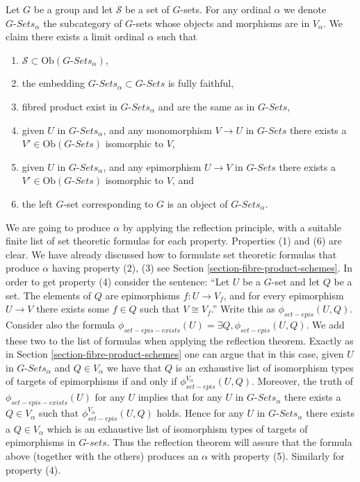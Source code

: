 \noindent
Let $G$ be a group and let $\mathcal{S}$ be a 
set of $G$-sets. For any ordinal $\alpha$ we denote
$G\textit{-Sets}_\alpha$ the subcategory of $G$-sets
whose objects and morphisms are in $V_\alpha$.
We claim there exists a limit ordinal $\alpha$ such that
\begin{enumerate}
\item $\mathcal{S} \subset \text{Ob}(G\textit{-Sets}_\alpha)$,
\item the embedding $G\textit{-Sets}_\alpha \subset G\textit{-Sets}$
is fully faithful,
\item fibred product exist in $G\textit{-Sets}_\alpha$
and are the same as in $G\textit{-Sets}$,
\item given $U$ in $G\textit{-Sets}_\alpha$, and any monomorphism
$V \to U$ in $G\textit{-Sets}$ there exists a
$V' \in \text{Ob}(G\textit{-Sets})$ isomorphic to $V$,
\item given $U$ in $G\textit{-Sets}_\alpha$, and any epimorphism
$U \to V$ in $G\textit{-Sets}$ there exists a
$V' \in \text{Ob}(G\textit{-Sets})$ isomorphic to $V$, and
\item the left $G$-set corresponding to $G$ is an object of
$G\textit{-Sets}_\alpha$.
\end{enumerate}
We are going to produce $\alpha$ by applying the reflection
principle, with a suitable finite list of set theoretic formulas
for each property. Properties (1) and (6) are clear.
We have already discussed how to formulate set
theoretic formulas that produce $\alpha$ having property (2), (3)
see Section \ref{section-fibre-product-schemes}. In order to 
get property (4) consider the sentence: ``Let $U$ be a $G$-set
and let $Q$ be a set. The elements of $Q$ are epimorphisms
$f : U \to V_f$, and for every epimorphism $U \to V$
there exists some $f \in Q$ such that $V \cong V_f$.''
Write this as $\phi_{set-epis}(U, Q)$. Consider also
the formula $\phi_{set-epis-exists}(U) = \exists Q, \phi_{set-epis}(U, Q)$.
We add these two to the list of formulas when applying the
reflection theorem. Exactly as in Section \ref{section-fibre-product-schemes}
one can argue that in this case, given $U$ in $G\textit{-Sets}_\alpha$
and $Q \in V_\alpha$ we have that $Q$ is an exhaustive list of
isomorphism types of targets of epimorphisms if and only if
$\phi_{set-epis}^{V_\alpha}(U, Q)$. Moreover, the truth of
$\phi_{set-epis-exists}(U)$ for any $U$ implies that for
any $U$ in $G\textit{-Sets}_\alpha$ there exists a 
$Q \in V_\alpha$ such that $\phi_{set-epis}^{V_\alpha}(U, Q)$ holds.
Hence for any $U$ in $G\textit{-Sets}_\alpha$ there exists a
$Q \in V_\alpha$ which is an exhaustive list of
isomorphism types of targets of epimorphisms in $G\textit{-sets}$.
Thus the reflection theorem will assure that
the formula above (together with the others) produces an $\alpha$
with property (5). Similarly for property (4).

